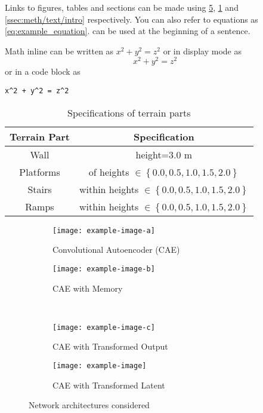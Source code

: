 Links to figures, tables and sections can be made using \cref{fig:network_archs}, \cref{tab:terrain_params} and \cref{ssec:meth/text/intro} respectively. You can also refer to equations as \cref{eq:example_equation}.  can be used at the beginning of a sentence. 

Math inline can be written as $x^2 + y^2 = z^2$ or in display mode as
\begin{equation}
    x^2 + y^2 = z^2
    \label{eq:example_equation}
\end{equation}
or in a code block as
\begin{verbatim}
x^2 + y^2 = z^2
\end{verbatim}

\begin{table}
    \centering
    \begin{tabular}{|c|c|}
        \hline
        \textbf{Terrain Part} & \textbf{Specification} \\ \hline
        Wall & height=$3.0$ m \\
        Platforms & of heights $ \in \left\{0.0, 0.5, 1.0, 1.5, 2.0\right\} $\\
        Stairs & within heights $ \in \left\{0.0, 0.5, 1.0, 1.5, 2.0\right\} $\\
        Ramps & within heights $ \in \left\{0.0, 0.5, 1.0, 1.5, 2.0\right\} $\\
        \hline
    \end{tabular}
    \caption{Specifications of terrain parts}
    \label{tab:terrain_params}
\end{table}

\begin{figure}[btph]
    \centering
    \begin{subfigure}[b]{0.47\linewidth}
        \centering
        \texttt{[image: example-image-a]}
        \caption{Convolutional Autoencoder (CAE)}
        \label{fig:conv_arch}
    \end{subfigure}
    \hfill
    \begin{subfigure}[b]{0.47\linewidth}
        \centering
        \texttt{[image: example-image-b]}
        \caption{CAE with Memory}
        \label{fig:convmem_arch}
    \end{subfigure}
    \\
    \begin{subfigure}[b]{0.47\linewidth}
        \centering
        \texttt{[image: example-image-c]}
        \caption{CAE with Transformed Output}
        \label{fig:davidu_arch}
    \end{subfigure}
    \hfill
    \begin{subfigure}[b]{0.47\linewidth}
        \centering
        \texttt{[image: example-image]}
        \caption{CAE with Transformed Latent}
        \label{fig:convmemtr_arch}
    \end{subfigure}
    \caption{Network architectures considered}
    \label{fig:network_archs}
\end{figure}
